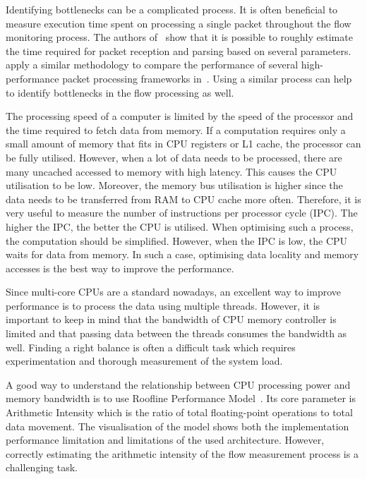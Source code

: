 Identifying bottlenecks can be a complicated process. It is often beneficial to measure execution time spent on processing a single packet throughout the flow monitoring process. The authors of~\cite{NETCOPETechnologies-2017-Modelling} show that it is possible to roughly estimate the time required for packet reception and parsing based on several parameters. \citeauthor{Gallenmueller-2015-Comparison} apply a similar methodology to compare the performance of several high-performance packet processing frameworks in~\cite{Gallenmueller-2015-Comparison}. Using a similar process can help to identify bottlenecks in the flow processing as well.

The processing speed of a computer is limited by the speed of the processor and the time required to fetch data from memory. If a computation requires only a small amount of memory that fits in CPU registers or L1 cache, the processor can be fully utilised. However, when a lot of data needs to be processed, there are many uncached accessed to memory with high latency. This causes the CPU utilisation to be low. Moreover, the memory bus utilisation is higher since the data needs to be transferred from RAM to CPU cache more often. Therefore, it is very useful to measure the number of instructions per processor cycle (IPC). The higher the IPC, the better the CPU is utilised. When optimising such a process, the computation should be simplified. However, when the IPC is low, the CPU waits for data from memory. In such a case, optimising data locality and memory accesses is the best way to improve the performance. 

Since multi-core CPUs are a standard nowadays, an excellent way to improve performance is to process the data using multiple threads. However, it is important to keep in mind that the bandwidth of CPU memory controller is limited and that passing data between the threads consumes the bandwidth as well. Finding a right balance is often a difficult task which requires experimentation and thorough measurement of the system load.

A good way to understand the relationship between CPU processing power and memory bandwidth is to use Roofline Performance Model~\cite{Williams-2009-Roofline}. Its core parameter is Arithmetic Intensity which is the ratio of total floating-point operations to total data movement. The visualisation of the model shows both the implementation performance limitation and limitations of the used architecture. However, correctly estimating the arithmetic intensity of the flow measurement process is a challenging task.

